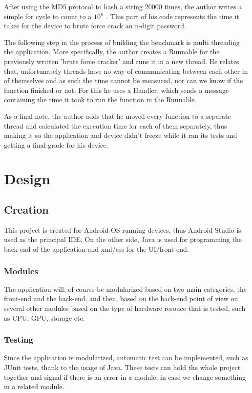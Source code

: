 \documentclass[a4paper,10pt]{report}
\begin{document}
 After using the MD5 protocol to hash a string 20000 times, the author writes a simple for cycle to count to a $ 10^n $ . This part of his code represents the time it takes for the device to brute force crack an n-digit password. 
 
 The following step in the process of building the benchmark is multi threading the application. More specifically, the author creates a Runnable for the previously written 'brute force cracker' and runs it in a new thread. He relates that, unfortunately threads have no way of communicating between each other in of themselves and as such the time cannot be measured, nor can we know if the function finished or not. For this he uses a Handler, which sends a message containing the time it took to run the function in the Runnable.
 
 As a final note, the author adds that he moved every function to a separate thread and calculated the execution time for each of them separately, thus making it so the application and device didn't freeze while it ran its tests and getting a final grade for his device.

\chapter{Design}
\section{Creation}
 This project is created for Android OS running devices, thus Android Studio is used as the principal IDE. On the other side, Java is used for programming the back-end of the application and xml/css for the UI/front-end.
 
 \subsection{Modules}
 The application will, of course be modularized based on two main categories, the front-end and the back-end, and then, based on the back-end point of view on several other modules based on the type of hardware resouce that is tested, such as CPU, GPU, storage etc.
 
 \subsection{Testing}
 Since the application is modularized, automatic test can be implemented, such as JUnit tests, thank to the usage of Java. These tests can hold the whole project together and signal if there is an error in a module, in case we change something in a related module.
 
\end{document}
